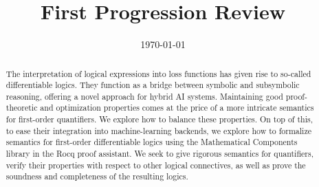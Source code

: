 \documentclass[sotoncolour]{uosthesis}      %
\title      {First Progression Review}
\date       {\today}
\begin{document}
\maketitle
\begin{abstract}
The interpretation of logical expressions into loss functions has given rise to so-called differentiable logics. They function as a bridge between symbolic and subsymbolic reasoning, offering a novel approach for hybrid AI systems. Maintaining good proof-theoretic and optimization properties comes at the price of a more intricate semantics for first-order quantifiers. We explore how to balance these properties. On top of this, to ease their integration into machine-learning backends, we explore how to formalize semantics for first-order differentiable logics using the Mathematical Components library in the Rocq proof assistant. We seek to give rigorous semantics for quantifiers, verify their properties with respect to other logical connectives, as well as prove the soundness and completeness of the resulting logics.
\end{abstract}

\end{document}
